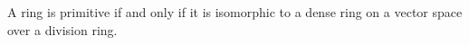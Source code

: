 %
%
%
%


\begin{theorem}[Jacobson]
	\label{thm:density}
	A ring is primitive if and only if it is isomorphic to a dense ring on 
	a vector space over a division ring.
\end{theorem}

